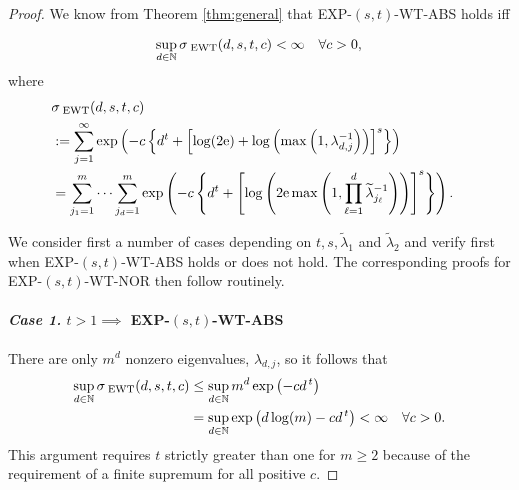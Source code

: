 \documentclass[graybox]{svmult}
\newcommand{\tlambda}{\widetilde{\lambda}}
\newcommand{\naturals}{\mathbb{N}}
\newcommand{\me}{\mathrm{e}}
\newcommand{\SEWT}{\sigma_{\;\textup{EWT}}}
\newcommand{\EXP}{\textup{EXP}\xspace}
\newcommand{\NOR}{\textup{NOR}\xspace}
\newcommand{\ABS}{\textup{ABS}\xspace}
\newcommand{\WT}{\textup{WT}\xspace}
\newcommand{\fh}[1]{{\color{green}{#1}}}
\begin{document}
\begin{proof}

We know from Theorem \ref{thm:general} that \EXP-$(s,t)$-\WT-\ABS holds iff

        \begin{equation} \label{EXPWTcond}
        \sup_{d \in \naturals}  \SEWT(d,s,t ,c) < \infty \quad \forall c>0,\\
        \end{equation}
        where
        \begin{align}
        \nonumber
        \lefteqn{\SEWT(d,s,t,c )} \\
        \label{SEWTSingSum}
         & :=  \sum_{j=1}^\infty \exp\left( -c \left \{d^t + \left [ \log(2\me) + 
         \log \left(\max\left(1, \lambda_{d,j}^{-1} \right) \right) \right]^s \right \}\right) \\
         \label{SEWTmultisum}
        &=  \sum_{j_1=1}^m \cdots   \sum_{j_d=1}^m   \exp\left( -c \left \{ d^t + 
        \left [ \log \left(2 \me \max\left(1, \prod_{\ell = 1}^d \tlambda_{j_\ell}^{-1} \right) \right) \right]^s  \right\} \right).
        \end{align}



We consider first a number of cases depending on $t,s,\tlambda_1$ and
        $\tlambda_2$ and verify first when \EXP-$(s,t)$-\WT-\ABS holds or does
        not hold.  The corresponding proofs for \EXP-$(s,t)$-\WT-\NOR then follow routinely. \fh{The first two cases establish exponential tractability, and both arguments require that $m$ be finite.  The next three cases establish the absence of tractability, and do not require that $m$ be finite.}


\paragraph{\textit{Case 1.} $t>1 \implies $ \EXP-$(s,t)$-\WT-\ABS}

        There are only $m^d$ nonzero eigenvalues,
$\lambda_{d,j}$, so it follows that
        \begin{align*}
        \sup_{d \in \naturals}
\SEWT(d,s,t,c )
&\le \sup_{d \in \naturals} m^d \exp\left( -c
d^{\,t}  \right) \\
        & = \sup_{d \in \naturals}  \exp\left(d \log(m) -c
d^{\,t}  \right) < \infty \quad \forall c > 0.
        \end{align*}
        This argument requires $t$ strictly greater than one
for $m\ge2$ because of the requirement of a finite supremum
for all positive $c$.


\end{proof}
\end{document}
